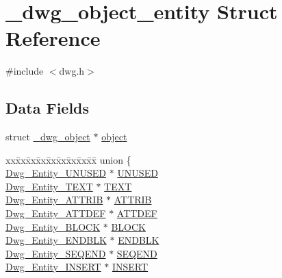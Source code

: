 \hypertarget{struct__dwg__object__entity}{\section{\-\_\-dwg\-\_\-object\-\_\-entity \-Struct \-Reference}
\label{struct__dwg__object__entity}
}


{\ttfamily \#include $<$dwg.\-h$>$}

\subsection*{\-Data \-Fields}
\begin{DoxyCompactItemize}
\item 
struct \hyperlink{struct__dwg__object}{\-\_\-dwg\-\_\-object} $\ast$ \hyperlink{struct__dwg__object__entity_a1ab4aa008fa123ed107de3cf7c238895}{object}
\item 
\begin{tabbing}
xx\=xx\=xx\=xx\=xx\=xx\=xx\=xx\=xx\=\kill
union \{\\
\>\hyperlink{dwg_8h_a7fff958f189073150f91a2527d49bdfa}{Dwg\_Entity\_UNUSED} $\ast$ \hyperlink{struct__dwg__object__entity_aa37852b1a0b1f6fc72175566ed9e6db6}{UNUSED}\\
\>\hyperlink{dwg_8h_a8ac9f84b09290097bebeb4cd60c90b02}{Dwg\_Entity\_TEXT} $\ast$ \hyperlink{struct__dwg__object__entity_ae4614684408de637d590573a435da791}{TEXT}\\
\>\hyperlink{dwg_8h_a5c97341d77243188e36565a5203069d3}{Dwg\_Entity\_ATTRIB} $\ast$ \hyperlink{struct__dwg__object__entity_a49281b5cb8afec3123f50638345112bc}{ATTRIB}\\
\>\hyperlink{dwg_8h_a1af35b10dfa7d98b590554a06c9c5fe6}{Dwg\_Entity\_ATTDEF} $\ast$ \hyperlink{struct__dwg__object__entity_a81c62db90bb3a365fec04ed86a58b20a}{ATTDEF}\\
\>\hyperlink{dwg_8h_a3ae15677b9c9ede71822baf485348846}{Dwg\_Entity\_BLOCK} $\ast$ \hyperlink{struct__dwg__object__entity_a440c90f1d003234b0bff04664634a520}{BLOCK}\\
\>\hyperlink{dwg_8h_ac26b423f97030340281c5510e930b82b}{Dwg\_Entity\_ENDBLK} $\ast$ \hyperlink{struct__dwg__object__entity_a1f282129e89976f97bac5daf765d63a0}{ENDBLK}\\
\>\hyperlink{dwg_8h_aad0a647d3a4f0756462042ee6858dd63}{Dwg\_Entity\_SEQEND} $\ast$ \hyperlink{struct__dwg__object__entity_aae4c51441567385b545b49f6e079d32d}{SEQEND}\\
\>\hyperlink{dwg_8h_a5ed7da72afab05afb540e602ec18db38}{Dwg\_Entity\_INSERT} $\ast$ \hyperlink{struct__dwg__object__entity_a35f238c6c20ba26bf523781db297e226}{INSERT}\\

\end{tabbing}
\end{DoxyCompactItemize}
